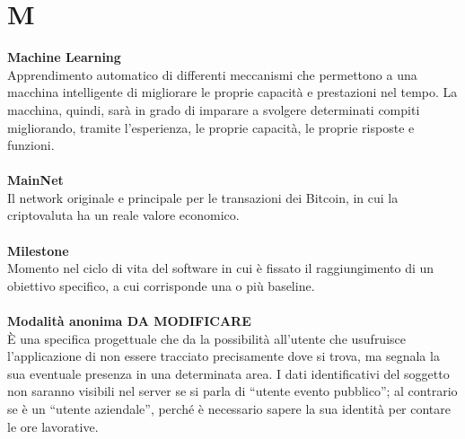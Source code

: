 \section{M}
\textbf{Machine Learning}\\
Apprendimento automatico di differenti meccanismi che permettono a una macchina intelligente di migliorare le proprie capacità e prestazioni nel tempo. La macchina, quindi, sarà in grado di imparare a svolgere determinati compiti migliorando, tramite l’esperienza, le proprie capacità, le proprie risposte e funzioni. \\ \\
\textbf{MainNet}\\
Il network originale e principale per le transazioni dei Bitcoin, in cui la criptovaluta ha un reale valore economico. \\ \\
\textbf{Milestone}\\
Momento nel ciclo di vita del software in cui è fissato il raggiungimento di un obiettivo specifico, a cui corrisponde una o più baseline.\\ \\
\textbf{Modalità anonima DA MODIFICARE}\\
È una specifica progettuale che da la possibilità all’utente che usufruisce l’applicazione di non essere tracciato precisamente dove si trova, ma segnala la sua eventuale presenza in una determinata area. I dati identificativi del soggetto non saranno visibili nel server se si parla di “utente evento pubblico”; al contrario se è un “utente aziendale”, perché è necessario sapere la sua identità per contare le ore lavorative. \\ \\
\clearpage